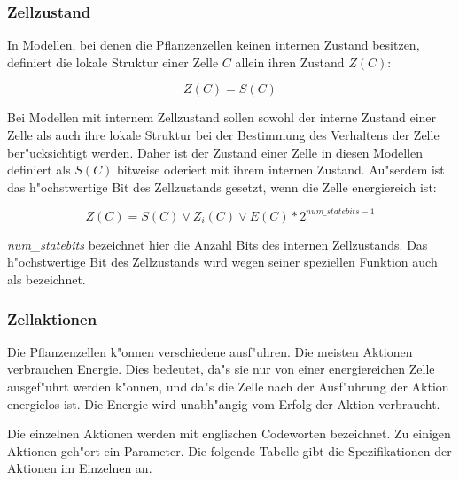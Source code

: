 \subsubsection{Zellzustand}

In Modellen, bei denen die Pflanzenzellen keinen internen Zustand besitzen,
definiert die lokale Struktur einer Zelle $C$ allein ihren Zustand $Z(C)$:

\begin{equation}
\label{stateq-nointernal}
Z(C) = S(C)
\end{equation}

Bei Modellen mit internem Zellzustand sollen sowohl der interne Zustand einer Zelle als auch 
ihre lokale Struktur bei der Bestimmung des Verhaltens der Zelle ber"ucksichtigt werden.
Daher ist der Zustand einer Zelle in diesen Modellen definiert als $S(C)$ bitweise oderiert mit ihrem
internen Zustand. Au"serdem ist das h"ochstwertige Bit des Zellzustands
gesetzt, wenn die Zelle energiereich ist:

\begin{equation}
\label{stateq-internal}
Z(C) = S(C) \vee Z_i(C) \vee E(C) * 2^{\mathit{num\_statebits} - 1}
\end{equation}

{\slshape num\_statebits} bezeichnet hier die Anzahl Bits des internen
Zellzustands. Das h"ochstwertige Bit des Zellzustands wird wegen seiner
speziellen Funktion auch als  bezeichnet.


\subsubsection{Zellaktionen}
\label{cellactiondef}

Die Pflanzenzellen k"onnen verschiedene  ausf"uhren. Die meisten
Aktionen verbrauchen Energie. Dies bedeutet, da"s sie nur von einer
energiereichen Zelle ausgef"uhrt werden k"onnen, und da"s die Zelle
nach der Ausf"uhrung der Aktion energielos ist. Die Energie wird
unabh"angig vom Erfolg der Aktion verbraucht.

Die einzelnen Aktionen werden mit englischen Codeworten bezeichnet.
Zu einigen Aktionen geh"ort ein Parameter. Die folgende Tabelle gibt
die Spezifikationen der Aktionen im Einzelnen an.

